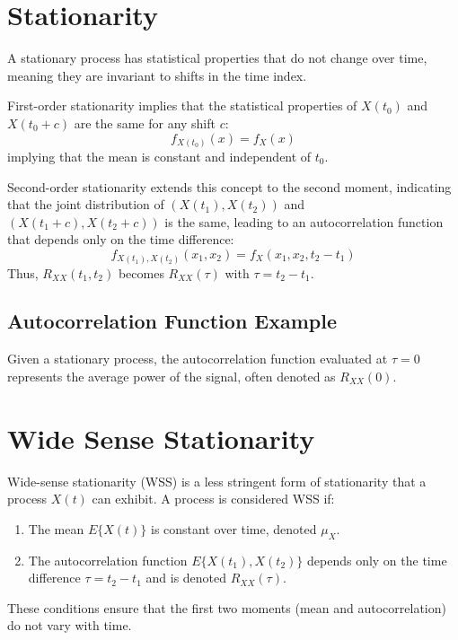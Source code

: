 \section*{Stationarity}

A stationary process has statistical properties that do not change over time, meaning they are invariant to shifts in the time index.

First-order stationarity implies that the statistical properties of \( X(t_0) \) and \( X(t_0 + c) \) are the same for any shift \( c \):
\[ f_{X(t_0)}(x) = f_{X}(x) \]
implying that the mean is constant and independent of \( t_0 \).

Second-order stationarity extends this concept to the second moment, indicating that the joint distribution of \( (X(t_1), X(t_2)) \) and \( (X(t_1 + c), X(t_2 + c)) \) is the same, leading to an autocorrelation function that depends only on the time difference:
\[ f_{X(t_1),X(t_2)}(x_1, x_2) = f_{X}(x_1, x_2, t_2 - t_1) \]
Thus, \( R_{XX}(t_1, t_2) \) becomes \( R_{XX}(\tau) \) with \( \tau = t_2 - t_1 \).

\subsection*{Autocorrelation Function Example}
Given a stationary process, the autocorrelation function evaluated at \( \tau = 0 \) represents the average power of the signal, often denoted as \( R_{XX}(0) \).


\section*{Wide Sense Stationarity}

Wide-sense stationarity (WSS) is a less stringent form of stationarity that a process \( X(t) \) can exhibit. A process is considered WSS if:
\begin{enumerate}
    \item The mean \( E\{X(t)\} \) is constant over time, denoted \( \mu_X \).
    \item The autocorrelation function \( E\{X(t_1),X(t_2)\} \) depends only on the time difference \( \tau = t_2 - t_1 \) and is denoted \( R_{XX}(\tau) \).
\end{enumerate}
These conditions ensure that the first two moments (mean and autocorrelation) do not vary with time.

